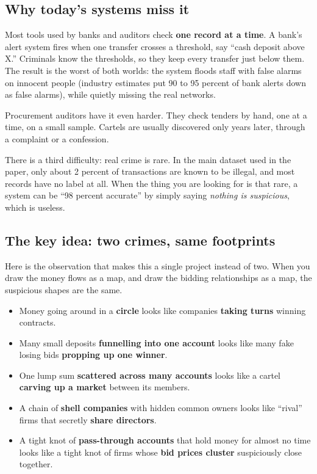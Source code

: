 \documentclass[11pt,a4paper]{article}
\begin{document}
\subsection{Why today's systems miss it}

Most tools used by banks and auditors check \textbf{one record at a time}. A
bank's alert system fires when one transfer crosses a threshold, say ``cash
deposit above X.'' Criminals know the thresholds, so they keep every transfer
just below them. The result is the worst of both worlds: the system floods
staff with false alarms on innocent people (industry estimates put 90 to 95
percent of bank alerts down as false alarms), while quietly missing the real
networks.

Procurement auditors have it even harder. They check tenders by hand, one at a
time, on a small sample. Cartels are usually discovered only years later,
through a complaint or a confession.

There is a third difficulty: real crime is rare. In the main dataset used in the
paper, only about 2 percent of transactions are known to be illegal, and most
records have no label at all. When the thing you are looking for is that rare,
a system can be ``98 percent accurate'' by simply saying \emph{nothing is
suspicious}, which is useless.

\subsection{The key idea: two crimes, same footprints}

Here is the observation that makes this a single project instead of two. When
you draw the money flows as a map, and draw the bidding relationships as a map,
the suspicious shapes are the same.

\begin{itemize}
\item Money going around in a \textbf{circle} looks like companies
      \textbf{taking turns} winning contracts.
\item Many small deposits \textbf{funnelling into one account} looks like many
      fake losing bids \textbf{propping up one winner}.
\item One lump sum \textbf{scattered across many accounts} looks like a cartel
      \textbf{carving up a market} between its members.
\item A chain of \textbf{shell companies} with hidden common owners looks like
      ``rival'' firms that secretly \textbf{share directors}.
\item A tight knot of \textbf{pass-through accounts} that hold money for almost
      no time looks like a tight knot of firms whose \textbf{bid prices cluster}
      suspiciously close together.
\end{itemize}
\end{document}
